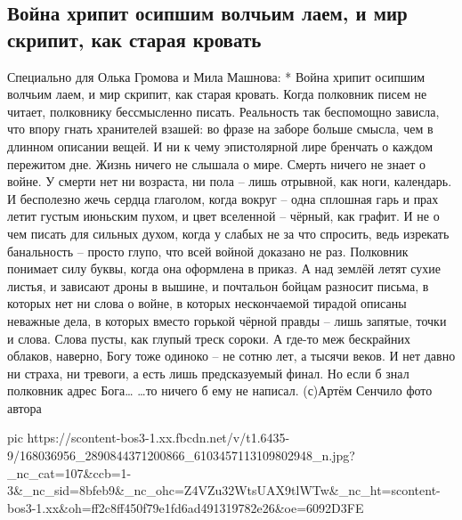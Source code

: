  
 
 
 
 

\subsection{Война хрипит осипшим волчьим лаем, и мир скрипит, как старая кровать}

Специально для Олька Громова и Мила Машнова:
*
Война хрипит осипшим волчьим лаем, и мир скрипит, как старая кровать. Когда полковник писем не читает, полковнику бессмысленно писать. Реальность так беспомощно зависла, что впору гнать хранителей взашей: во фразе на заборе больше смысла, чем в длинном описании вещей. И ни к чему эпистолярной лире бренчать о каждом пережитом дне. Жизнь ничего не слышала о мире. Смерть ничего не знает о войне. У смерти нет ни возраста, ни пола – лишь отрывной, как ноги, календарь. И бесполезно жечь сердца глаголом, когда вокруг – одна сплошная гарь и прах летит густым июньским пухом, и цвет вселенной – чёрный, как графит. И не о чем писать для сильных духом, когда у слабых не за что спросить, ведь изрекать банальность – просто глупо, что всей войной доказано не раз. Полковник понимает силу буквы, когда она оформлена в приказ.
А над землёй летят сухие листья, и зависают дроны в вышине, и почтальон бойцам разносит письма, в которых нет ни слова о войне, в которых нескончаемой тирадой описаны неважные дела, в которых вместо горькой чёрной правды – лишь запятые, точки и слова. Слова пусты, как глупый треск сороки. А где-то меж бескрайних облаков, наверно, Богу тоже одиноко – не сотню лет, а тысячи веков. И нет давно ни страха, ни тревоги, а есть лишь предсказуемый финал. Но если б знал полковник адрес Бога…
…то ничего б ему не написал.
(с)Артём Сенчило
фото автора

\ifcmt
  pic https://scontent-bos3-1.xx.fbcdn.net/v/t1.6435-9/168036956_2890844371200866_6103457113109802948_n.jpg?_nc_cat=107&ccb=1-3&_nc_sid=8bfeb9&_nc_ohc=Z4VZu32WtsUAX9tlWTw&_nc_ht=scontent-bos3-1.xx&oh=ff2c8ff450f79e1fd6ad491319782e26&oe=6092D3FE
\fi

